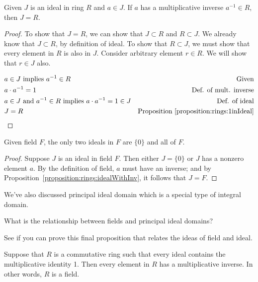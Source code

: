 \begin{prop}\label{proposition:rings:idealWithInv}
Given $J$ is an ideal in ring $R$ and $a\in J$.  If $a$ has a multiplicative inverse $a^{-1}\in R$, then $J=R$.
\end{prop}

\begin{proof}{}
To show that $J=R$, we can show that $J\subset R$ and $R\subset J$.  We already know that $J\subset R$, by definition of ideal.  To show that $R\subset J$, we must show that every element in $R$ is also in $J$.  Consider arbitrary element $r\in R$. We will show that $r\in J$ also.

\begin{align*}
 &a\in J \text{ implies } a^{-1}\in R & \text{Given}\\
 &a\cdot a^{-1} = 1 & \text{Def. of mult. inverse}\\
 &a\in J \text{ and } a^{-1}\in R \text{ implies } a\cdot a^{-1}=1\in J & \text{Def. of ideal}\\
 &J = R  & \text{Proposition~\ref{proposition:rings:1inIdeal}}
\end{align*}

\end{proof}


\begin{prop}
Given field $F$, the only two ideals in $F$ are $\{0\}$ and all of $F$.

\begin{proof}
Suppose $J$ is an ideal in field $F$.  Then either $J=\{0\}$ or $J$ has a nonzero element $a$. By the definition of field, $a$ must have an inverse; and by Proposition~\ref{proposition:rings:idealWithInv}, it follows that $J=F$.
\end{proof}
\end{prop}

We've also discussed principal ideal domain which is a special type of integral domain.

\begin{exercise}
What is the relationship between fields and principal ideal domains?
\end{exercise}

See if you can prove this final proposition that relates the ideas of field and ideal. 

\begin{prop}\label{proposition:rings:idealField}
Suppose that $R$ is a commutative ring such that every ideal contains the multiplicative identity 1. Then every element in $R$ has a multiplicative inverse. In other words, $R$ is a field.\\
\end{prop}

